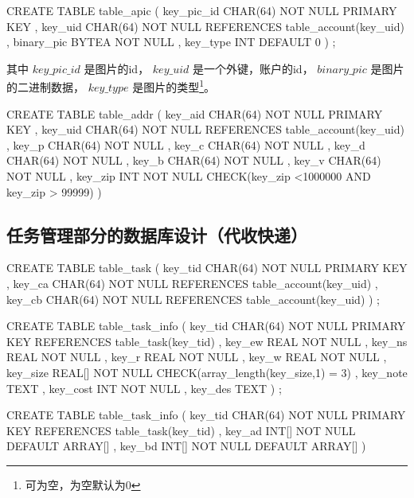 \begin{sql}[caption=创建账户照片表 table\_apic]
    CREATE TABLE table_apic
        ( key_pic_id CHAR(64) NOT NULL PRIMARY KEY
        , key_uid CHAR(64) NOT NULL REFERENCES table_account(key_uid)
        , binary_pic BYTEA NOT NULL
        , key_type INT DEFAULT 0
        )
    ;
\end{sql}
其中 $key\_pic\_id$ 是图片的id，
$key\_uid$ 是一个外键，账户的id，
$binary\_pic$ 是图片的二进制数据，
$key\_type$ 是图片的类型\footnote{可为空，为空默认为0}。
\begin{sql}[caption=创建用户收货地址表 table\_addr]
	CREATE TABLE table_addr
		( key_aid CHAR(64) NOT NULL PRIMARY KEY
		, key_uid CHAR(64) NOT NULL REFERENCES table_account(key_uid)
		, key_p CHAR(64) NOT NULL 
		, key_c CHAR(64) NOT NULL
		, key_d CHAR(64) NOT NULL
		, key_b CHAR(64) NOT NULL
		, key_v CHAR(64) NOT NULL
		, key_zip INT NOT NULL CHECK(key_zip <1000000 AND key_zip > 99999)
		)
\end{sql}
\subsection{任务管理部分的数据库设计（代收快递）}
\begin{sql}[caption=创建任务关联表 table\_task]
    CREATE TABLE table_task
        ( key_tid CHAR(64) NOT NULL PRIMARY KEY
        , key_ca CHAR(64) NOT NULL REFERENCES table_account(key_uid)
        , key_cb CHAR(64) NOT NULL REFERENCES table_account(key_uid)
        )
    ;
\end{sql}

\begin{sql}[caption=创建任务信息表 table\_task\_info]
    CREATE TABLE table_task_info
        ( key_tid CHAR(64) NOT NULL PRIMARY KEY REFERENCES table_task(key_tid)
        , key_ew REAL NOT NULL
        , key_ns REAL NOT NULL
        , key_r REAL NOT NULL
        , key_w REAL NOT NULL
        , key_size REAL[] NOT NULL CHECK(array_length(key_size,1) = 3)
        , key_note TEXT
        , key_cost INT NOT NULL
        , key_des TEXT
        )
    ;
\end{sql}

\begin{sql}[caption=创建任务议价表 table\_task\_cost]
    CREATE TABLE table_task_info
        ( key_tid CHAR(64) NOT NULL PRIMARY KEY REFERENCES table_task(key_tid)
        , key_ad INT[] NOT NULL DEFAULT ARRAY[]
        , key_bd INT[] NOT NULL DEFAULT ARRAY[]
        )
\end{sql}

